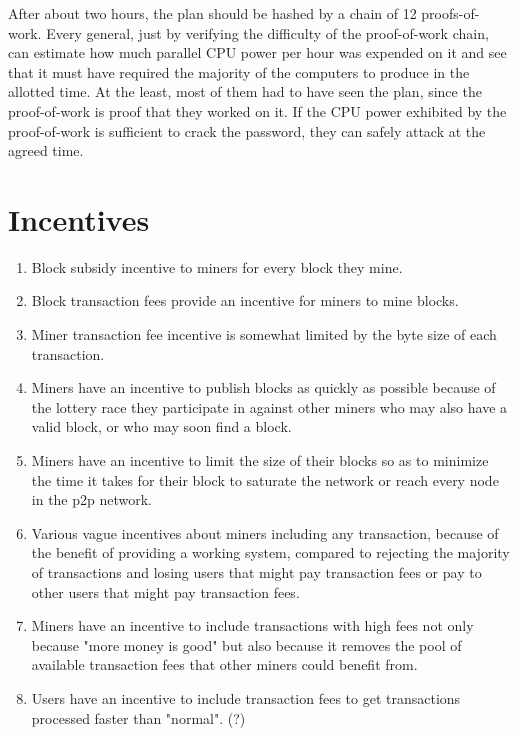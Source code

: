 \documentclass[letterpaper]{article}
\begin{document}
After about two hours, the plan should be hashed by a chain of 12
proofs-of-work. Every general, just by verifying the difficulty of the
proof-of-work chain, can estimate how much parallel CPU power per hour was
expended on it and see that it must have required the majority of the computers
to produce in the allotted time. At the least, most of them had to have seen
the plan, since the proof-of-work is proof that they worked on it. If the CPU
power exhibited by the proof-of-work is sufficient to crack the password, they
can safely attack at the agreed time.

\section{Incentives}

\begin{enumerate}
\item Block subsidy incentive to miners for every block they mine.

\item Block transaction fees provide an incentive for miners to mine blocks.

\item Miner transaction fee incentive is somewhat limited by the byte size of
each transaction.

\item Miners have an incentive to publish blocks as quickly as possible because
of the lottery race they participate in against other miners who may also have
a valid block, or who may soon find a block.

\item Miners have an incentive to limit the size of their blocks so as to
minimize the time it takes for their block to saturate the network or reach
every node in the p2p network.

\item Various vague incentives about miners including any transaction, because
of the benefit of providing a working system, compared to rejecting the
majority of transactions and losing users that might pay transaction fees or
pay to other users that might pay transaction fees.

\item Miners have an incentive to include transactions with high fees not only
because "more money is good" but also because it removes the pool of available
transaction fees that other miners could benefit from.

\item Users have an incentive to include transaction fees to get transactions
processed faster than "normal". (?)


\end{enumerate}
\end{document}
